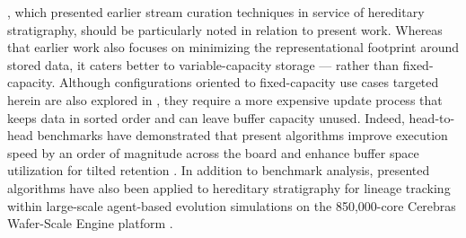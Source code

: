
\citet{moreno2024algorithms}, which presented earlier stream curation techniques in service of hereditary stratigraphy, should be particularly noted in relation to present work.
Whereas that earlier work also focuses on minimizing the representational footprint around stored data, it caters better to variable-capacity storage --- rather than fixed-capacity.
Although configurations oriented to fixed-capacity use cases targeted herein are also explored in \citet{moreno2024algorithms}, they require a more expensive update process that keeps data in sorted order and can leave buffer capacity unused.
Indeed, head-to-head benchmarks have demonstrated that present algorithms improve execution speed by an order of magnitude across the board and enhance buffer space utilization for tilted retention \citep{moreno2024guide,moreno2024trackable}.
In addition to benchmark analysis, presented algorithms have also been applied to hereditary stratigraphy for lineage tracking within large-scale agent-based evolution simulations on the 850,000-core Cerebras Wafer-Scale Engine platform \citep{moreno2024trackable}.
